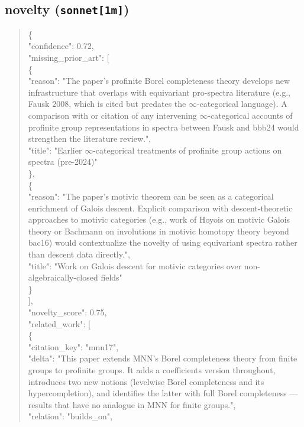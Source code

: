 \documentclass[11pt]{article}
\begin{document}
\subsection*{novelty (\texttt{sonnet[1m]})}
\begin{quote}\small\ttfamily\raggedright
\{\\
  "confidence": 0.72,\\
  "missing\_prior\_art": [\\
    \{\\
      "reason": "The paper's profinite Borel completeness theory develops new infrastructure that overlaps with equivariant pro-spectra literature (e.g., Fausk 2008, which is cited but predates the \ensuremath{\infty}-categorical language). A comparison with or citation of any intervening \ensuremath{\infty}-categorical accounts of profinite group representations in spectra between Fausk and bbb24 would strengthen the literature review.",\\
      "title": "Earlier \ensuremath{\infty}-categorical treatments of profinite group actions on spectra (pre-2024)"\\
    \},\\
    \{\\
      "reason": "The paper's motivic theorem can be seen as a categorical enrichment of Galois descent. Explicit comparison with descent-theoretic approaches to motivic categories (e.g., work of Hoyois on motivic Galois theory or Bachmann on involutions in motivic homotopy theory beyond bac16) would contextualize the novelty of using equivariant spectra rather than descent data directly.",\\
      "title": "Work on Galois descent for motivic categories over non-algebraically-closed fields"\\
    \}\\
  ],\\
  "novelty\_score": 0.75,\\
  "related\_work": [\\
    \{\\
      "citation\_key": "mnn17",\\
      "delta": "This paper extends MNN's Borel completeness theory from finite groups to profinite groups. It adds a coefficients version throughout, introduces two new notions (levelwise Borel completeness and its hypercompletion), and identifies the latter with full Borel completeness --- results that have no analogue in MNN for finite groups.",\\
      "relation": "builds\_on",\\

\end{quote}
\end{document}
